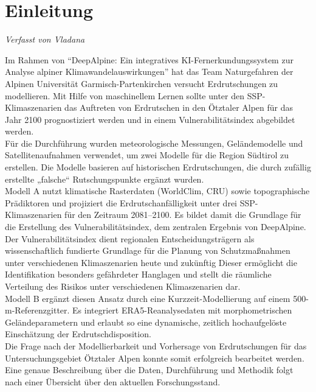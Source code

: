 \documentclass[../main.tex]{subfiles}
\begin{document}
\chapter{Einleitung}
\vspace{-0.5cm}
\noindent\textit{\small Verfasst von Vladana}
\vspace{0.5cm}

Im Rahmen von “DeepAlpine: Ein integratives KI-Fernerkundungssystem zur Analyse alpiner Klimawandelauswirkungen” hat das Team Naturgefahren der Alpinen Universität Garmisch-Partenkirchen versucht Erdrutschungen zu modellieren.
Mit Hilfe von maschinellem Lernen sollte unter den SSP-Klimaszenarien das Auftreten von Erdrutschen in den Ötztaler Alpen für das Jahr 2100 prognostiziert werden und in einem Vulnerabilitätsindex abgebildet werden. \\

Für die Durchführung wurden meteorologische Messungen, Geländemodelle und Satellitenaufnahmen verwendet, um zwei Modelle für die Region Südtirol zu erstellen.
Die Modelle basieren auf historischen Erdrutschungen, die durch zufällig erstellte „falsche“ Rutschungspunkte ergänzt wurden. \\

Modell A nutzt klimatische Rasterdaten (WorldClim, CRU) sowie topographische Prädiktoren und projiziert die Erdrutschanfälligkeit unter drei SSP-Klimaszenarien für den Zeitraum 2081--2100.
Es bildet damit die Grundlage für die Erstellung des Vulnerabilitätsindex, dem zentralen Ergebnis von DeepAlpine.
Der Vulnerabilitätsindex dient regionalen Entscheidungsträgern als wissenschaftlich fundierte Grundlage für die Planung von Schutzmaßnahmen unter verschiedenen Klimaszenarien heute und zukünftig
Dieser ermöglicht die Identifikation besonders gefährdeter Hanglagen und stellt die räumliche Verteilung des Risikos unter verschiedenen Klimaszenarien dar. \\
Modell B ergänzt diesen Ansatz durch eine Kurzzeit-Modellierung auf einem 500-m-Referenzgitter.
Es integriert ERA5-Reanalysedaten mit morphometrischen Geländeparametern und erlaubt so eine dynamische, zeitlich hochaufgelöste Einschätzung der Erdrutschdisposition. \\

Die Frage nach der Modellierbarkeit und Vorhersage von Erdrutschungen für das Untersuchungsgebiet Ötztaler Alpen konnte somit erfolgreich bearbeitet werden.
Eine genaue Beschreibung über die Daten, Durchführung und Methodik folgt nach einer Übersicht über den aktuellen Forschungsstand.
\end{document}
